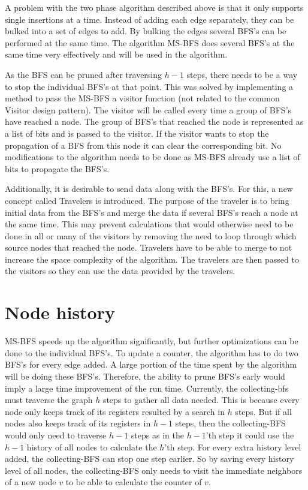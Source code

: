 A problem with the two phase algorithm described above is that it only supports single insertions at a time. Instead of adding each edge separately, they can be bulked into a set of edges to add. By bulking the edges several BFS's can be performed at the same time. The algorithm MS-BFS \cite{msbfs} does several BFS's at the same time very effectively and will be used in the algorithm. 

As the BFS can be pruned after traversing $h-1$ steps, there needs to be a way to stop the individual BFS's at that point. This was solved by implementing a method to pass the MS-BFS a visitor function (not related to the common Visitor design pattern). The visitor will be called every time a group of BFS's have reached a node. The group of BFS's that reached the node is represented as a list of bits and is passed to the visitor. If the visitor wants to stop the propagation of a BFS from this node it can clear the corresponding bit. No modifications to the algorithm needs to be done as MS-BFS already use a list of bits to propagate the BFS's.

Additionally, it is desirable to send data along with the BFS's. For this, a new concept called Travelers is introduced. The purpose of the traveler is to bring initial data from the BFS's and merge the data if several BFS's reach a node at the same time. This may prevent calculations that would otherwise need to be done in all or many of the visitors by removing the need to loop through which source nodes that reached the node. Travelers have to be able to merge to not increase the space complexity of the algorithm. The travelers are then passed to the visitors so they can use the data provided by the travelers. 

\section{Node history}

MS-BFS speeds up the algorithm significantly, but further optimizations can be done to the individual BFS's. To update a counter, the algorithm has to do two BFS's for every edge added. A large portion of the time spent by the algorithm will be doing these BFS's. Therefore, the ability to prune BFS's early would imply a large time improvement of the run time. Currently, the collecting-bfs must traverse the graph $h$ steps to gather all data needed. This is because every node only keeps track of its registers resulted by a search in $h$ steps. But if all nodes also keeps track of its registers in $h-1$ steps, then the collecting-BFS would only need to traverse $h-1$ steps as in the $h-1$'th step it could use the $h-1$ history of all nodes to calculate the $h$'th step. For every extra history level added, the collecting-BFS can stop one step earlier. So by saving every history level of all nodes, the collecting-BFS only needs to visit the immediate neighbors of a new node $v$ to be able to calculate the counter of $v$. 

